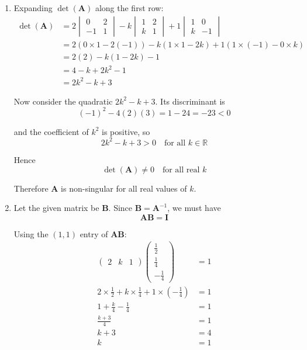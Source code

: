 \documentclass[leqno]{article}
\begin{document}
\begin{enumerate}[
  label=\textbf{\arabic*.},
  leftmargin=*,
  topsep=0pt,
  partopsep=0pt,
  parsep=0pt
]
\vspace*{10pt}

\begin{djsSolution}
\begin{enumerate}[label=\textbf{(\alph*)}]
  \item Expanding $\det(\mathbf{A})$ along the first row:
\begin{align*}
\det(\mathbf{A})
&=2\begin{vmatrix}0&2\\-1&1\end{vmatrix}
-k\begin{vmatrix}1&2\\ k&1\end{vmatrix}
+1\begin{vmatrix}1&0\\ k&-1\end{vmatrix}\\
&=2(0\times 1-2(-1))-k(1\times 1-2k)+1(1\times(-1)-0\times k)\\
&=2(2)-k(1-2k)-1\\
&=4-k+2k^2-1\\
&=2k^2-k+3
\end{align*}

Now consider the quadratic $2k^2-k+3$. Its discriminant is
\[
(-1)^2-4(2)(3)=1-24=-23<0
\]

and the coefficient of $k^2$ is positive, so
\[
2k^2-k+3>0 \quad \text{for all } k\in\mathbb{R}
\]

Hence
\[
\det(\mathbf{A})\neq 0 \quad \text{for all real } k
\]

Therefore $\mathbf{A}$ is non-singular for all real values of $k$.

  \item Let the given matrix be $\mathbf{B}$. Since $\mathbf{B}=\mathbf{A}^{-1}$, we must have
\[
\mathbf{AB}=\mathbf{I}
\]

Using the $(1,1)$ entry of $\mathbf{AB}$:
\begin{align*}
\begin{pmatrix}2 & k & 1\end{pmatrix}
\begin{pmatrix}
\frac12\\[2pt]
\frac14\\[2pt]
-\frac14
\end{pmatrix}
&=1\\
2\times \frac12+k\times \frac14+1\times\left(-\frac14\right)&=1\\
1+\frac{k}{4}-\frac14&=1\\
\frac{k+3}{4}&=1\\
k+3&=4\\
k&=1
\end{align*}
\end{enumerate}
\end{djsSolution}



\end{enumerate}
\end{document}
